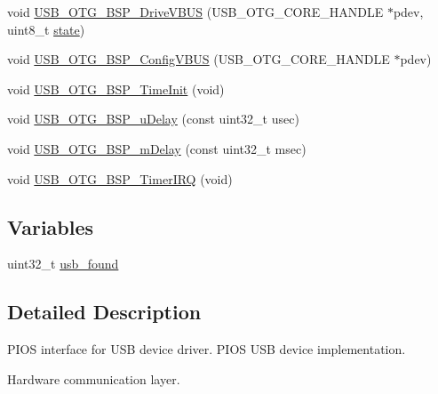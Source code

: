 \begin{DoxyCompactItemize}
\item 
void \hyperlink{group___p_i_o_s___u_s_b_ga1a0b196001899cd61bc722d080ca8161}{\-U\-S\-B\-\_\-\-O\-T\-G\-\_\-\-B\-S\-P\-\_\-\-Drive\-V\-B\-U\-S} (\-U\-S\-B\-\_\-\-O\-T\-G\-\_\-\-C\-O\-R\-E\-\_\-\-H\-A\-N\-D\-L\-E $\ast$pdev, uint8\-\_\-t \hyperlink{pios__flashfs__logfs_8c_a13a6109e91ad12705df96a0f2743c630}{state})
\item 
void \hyperlink{group___p_i_o_s___u_s_b_ga02dee21bb9a092415782c0e1a460981c}{\-U\-S\-B\-\_\-\-O\-T\-G\-\_\-\-B\-S\-P\-\_\-\-Config\-V\-B\-U\-S} (\-U\-S\-B\-\_\-\-O\-T\-G\-\_\-\-C\-O\-R\-E\-\_\-\-H\-A\-N\-D\-L\-E $\ast$pdev)
\item 
void \hyperlink{group___p_i_o_s___u_s_b_ga880a11758cfe2348112a30a0ea44c32f}{\-U\-S\-B\-\_\-\-O\-T\-G\-\_\-\-B\-S\-P\-\_\-\-Time\-Init} (void)
\item 
void \hyperlink{group___p_i_o_s___u_s_b_gaa70213d9a7b9b047dc6d3357f99e19b5}{\-U\-S\-B\-\_\-\-O\-T\-G\-\_\-\-B\-S\-P\-\_\-u\-Delay} (const uint32\-\_\-t usec)
\item 
void \hyperlink{group___p_i_o_s___u_s_b_ga28c906bec05a1b7f91aa0e4ff5d8a16c}{\-U\-S\-B\-\_\-\-O\-T\-G\-\_\-\-B\-S\-P\-\_\-m\-Delay} (const uint32\-\_\-t msec)
\item 
void \hyperlink{group___p_i_o_s___u_s_b_ga97a8f22d2dce112b90488d9afd3fbbdb}{\-U\-S\-B\-\_\-\-O\-T\-G\-\_\-\-B\-S\-P\-\_\-\-Timer\-I\-R\-Q} (void)
\end{DoxyCompactItemize}
\subsection*{\-Variables}
\begin{DoxyCompactItemize}
\item 
uint32\-\_\-t \hyperlink{group___p_i_o_s___u_s_b_ga2a91e3a5ac99b2ec7e0025c14ea0a34d}{usb\-\_\-found}
\end{DoxyCompactItemize}


\subsection{\-Detailed \-Description}
\-P\-I\-O\-S interface for \-U\-S\-B device driver. \-P\-I\-O\-S \-U\-S\-B device implementation.

\-Hardware communication layer. 

